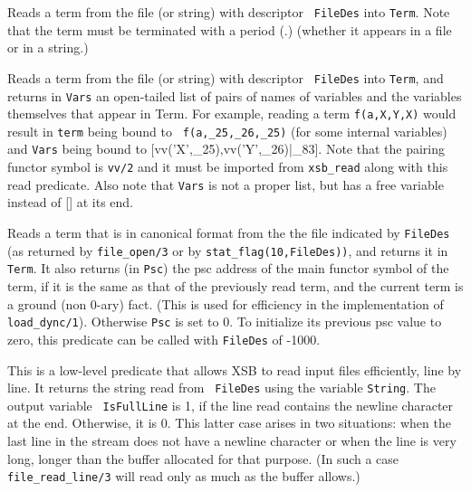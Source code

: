 \begin{description}
    Reads a term from the file (or string) with descriptor {\tt
    FileDes} into {\tt Term}.  Note that the term must be terminated
    with a period (.) (whether it appears in a file or in a string.)

    Reads a term from the file (or string) with descriptor {\tt
    FileDes} into {\tt Term}, and returns in {\tt Vars} an open-tailed list of
    pairs of names of variables and the variables themselves that
    appear in Term.  For example, reading a term {\tt f(a,X,Y,X)}
    would result in {\tt term} being bound to {\tt
    f(a,\_25,\_26,\_25)} (for some internal variables) and {\tt Vars}
    being bound to {[vv('X',\_25),vv('Y',\_26)|\_83]}.  Note that the
    pairing functor symbol is {\tt vv/2} and it must be imported from
    {\tt xsb\_read} along with this read predicate.  Also note that 
    {\tt Vars} is not a proper list, but has a free variable instead 
    of [] at its end.

    Reads a term that is in canonical format from the the file
    indicated by {\tt FileDes} (as returned by {\tt file\_open/3} or
    by {\tt stat\_flag(10,FileDes))}, and returns it in {\tt Term}.
    It also returns (in {\tt Psc}) the psc address of the main functor
    symbol of the term, if it is the same as that of the previously
    read term, and the current term is a ground (non 0-ary) fact.
    (This is used for efficiency in the implementation of {\tt
    load\_dync/1}).  Otherwise {\tt Psc} is set to 0.  To initialize
    its previous psc value to zero, this predicate can be called with
    {\tt FileDes} of -1000.

    This is a low-level predicate that allows XSB to read input files
    efficiently, line by line. It returns the string read from {\tt
      FileDes} using the variable {\tt String}. The output variable {\tt
      IsFullLine} is 1, if the line read contains the newline character at
    the end. Otherwise, it is 0. This latter case arises in two situations:
    when the last line in the stream does not have a newline  character or
    when the line is very long, longer than the buffer allocated for that
    purpose. (In such a case {\tt file\_read\_line/3} will read only as
    much as the buffer allows.) 


\end{description}
